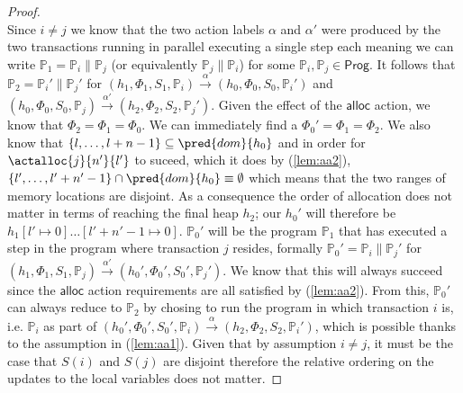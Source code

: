 \begin{proof}
\[\]
Since $i \neq j$ we know that the two action labels $\alpha$ and $\alpha'$ were produced by the two transactions running in parallel executing a single step each meaning we can write $\mathds{P}_1 = \mathds{P}_i \| \mathds{P}_j$ (or equivalently $\mathds{P}_j \| \mathds{P}_i$) for some $\mathds{P}_i, \mathds{P}_j \in \mathsf{Prog}$. It follows that $\mathds{P}_2 = \mathds{P}_i' \| \mathds{P}_j'$ for $(h_1, \Phi_1, S_1, \mathds{P}_i) \xrightarrow{\alpha} (h_0, \Phi_0, S_0, \mathds{P}_i')$ and $(h_0, \Phi_0, S_0, \mathds{P}_j) \xrightarrow{\alpha'} (h_2, \Phi_2, S_2, \mathds{P}_j')$. Given the effect of the $\mathsf{alloc}$ action, we know that $\Phi_2 = \Phi_1 = \Phi_0$. We can immediately find a $\Phi_0' = \Phi_1 = \Phi_2$. We also know that $\{l, \ldots, l + n - 1\} \subseteq \pred{dom}{h_0}$ and in order for $\actalloc{j}{n'}{l'}$ to suceed, which it does by (\ref{lem:aa2}), $\{l', \ldots, l' + n' - 1\} \cap \pred{dom}{h_0} \equiv \emptyset$ which means that the two ranges of memory locations are disjoint. As a consequence the order of allocation does not matter in terms of reaching the final heap $h_2$; our $h_0'$ will therefore be $h_1[l' \mapsto 0]\ldots[l' + n' - 1 \mapsto 0]$. $\mathds{P}_0'$ will be the program $\mathds{P}_1$ that has executed a step in the program where transaction $j$ resides, formally $\mathds{P}_0' = \mathds{P}_i \| \mathds{P}_j'$ for $(h_1, \Phi_1, S_1, \mathds{P}_j) \xrightarrow{\alpha'} (h_0', \Phi_0', S_0', \mathds{P}_j')$. We know that this will always succeed since the $\mathsf{alloc}$ action requirements are all satisfied by (\ref{lem:aa2}). From this, $\mathds{P}_0'$ can always reduce to $\mathds{P}_2$ by chosing to run the program in which transaction $i$ is, i.e. $\mathds{P}_i$ as part of $(h_0', \Phi_0', S_0', \mathds{P}_i) \xrightarrow{\alpha} (h_2, \Phi_2, S_2, \mathds{P}_i')$, which is possible thanks to the assumption in (\ref{lem:aa1}). Given that by assumption $i \neq j$, it must be the case that $S(i)$ and $S(j)$ are disjoint therefore the relative ordering on the updates to the local variables does not matter.
\end{proof}

